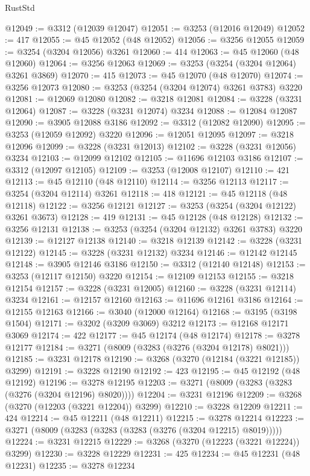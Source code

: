 \begin{lexlean}{RustStd}
\begin{coremodule}
{\begin{coremodule}
{{{{{{{{{{{{{{{{{{{{{{{{{{{{{{{{{{{{{@12049 := @3312 (@12039 @12047)
@12051 := @3253 (@12016 @12049)
@12052 := 417
@12055 := @45 @12052 (@48 @12052)
@12056 := @3256 @12055
@12059 := @3254 (@3204 @12056) @3261
@12060 := 414
@12063 := @45 @12060 (@48 @12060)
@12064 := @3256 @12063
@12069 := @3253 (@3254 (@3204 @12064) @3261 @3869)
@12070 := 415
@12073 := @45 @12070 (@48 @12070)
@12074 := @3256 @12073
@12080 := @3253 (@3254 (@3204 @12074) @3261 @3783) @3220
@12081 := @12069 @12080
@12082 := @3218 @12081
@12084 := @3228 (@3231 @12064)
@12087 := @3228 (@3231 @12074) @3234
@12088 := @12084 @12087
@12090 := @3905 @12088 @3186
@12092 := @3312 (@12082 @12090)
@12095 := @3253 (@12059 @12092) @3220
@12096 := @12051 @12095
@12097 := @3218 @12096
@12099 := @3228 (@3231 @12013)
@12102 := @3228 (@3231 @12056) @3234
@12103 := @12099 @12102
@12105 := @11696 @12103 @3186
@12107 := @3312 (@12097 @12105)
@12109 := @3253 (@12008 @12107)
@12110 := 421
@12113 := @45 @12110 (@48 @12110)
@12114 := @3256 @12113
@12117 := @3254 (@3204 @12114) @3261
@12118 := 418
@12121 := @45 @12118 (@48 @12118)
@12122 := @3256 @12121
@12127 := @3253 (@3254 (@3204 @12122) @3261 @3673)
@12128 := 419
@12131 := @45 @12128 (@48 @12128)
@12132 := @3256 @12131
@12138 := @3253 (@3254 (@3204 @12132) @3261 @3783) @3220
@12139 := @12127 @12138
@12140 := @3218 @12139
@12142 := @3228 (@3231 @12122)
@12145 := @3228 (@3231 @12132) @3234
@12146 := @12142 @12145
@12148 := @3905 @12146 @3186
@12150 := @3312 (@12140 @12148)
@12153 := @3253 (@12117 @12150) @3220
@12154 := @12109 @12153
@12155 := @3218 @12154
@12157 := @3228 (@3231 @12005)
@12160 := @3228 (@3231 @12114) @3234
@12161 := @12157 @12160
@12163 := @11696 @12161 @3186
@12164 := @12155 @12163
@12166 := @3040 (@12000 @12164)
@12168 := @3195 (@3198 @1504)
@12171 := @3202 (@3209 @3069) @3212
@12173 := @12168 @12171 @3069
@12174 := 422
@12177 := @45 @12174 (@48 @12174)
@12178 := @3278 @12177
@12184 := @3271 (@8009 (@3283 (@3276 (@3204 @12178) @8021)))
@12185 := @3231 @12178
@12190 := @3268 (@3270 (@12184 (@3221 @12185)) @3299)
@12191 := @3228 @12190
@12192 := 423
@12195 := @45 @12192 (@48 @12192)
@12196 := @3278 @12195
@12203 := @3271 (@8009 (@3283 (@3283 (@3276 (@3204 @12196) @8020))))
@12204 := @3231 @12196
@12209 := @3268 (@3270 (@12203 (@3221 @12204)) @3299)
@12210 := @3228 @12209
@12211 := 424
@12214 := @45 @12211 (@48 @12211)
@12215 := @3278 @12214
@12223 := @3271 (@8009 (@3283 (@3283 (@3283 (@3276 (@3204 @12215) @8019)))))
@12224 := @3231 @12215
@12229 := @3268 (@3270 (@12223 (@3221 @12224)) @3299)
@12230 := @3228 @12229
@12231 := 425
@12234 := @45 @12231 (@48 @12231)
@12235 := @3278 @12234
}}}}}}}}}}}}}}}}}}}}}}}}}}}}}}}}}}}}}
\end{coremodule}}
\end{coremodule}
\end{lexlean}
